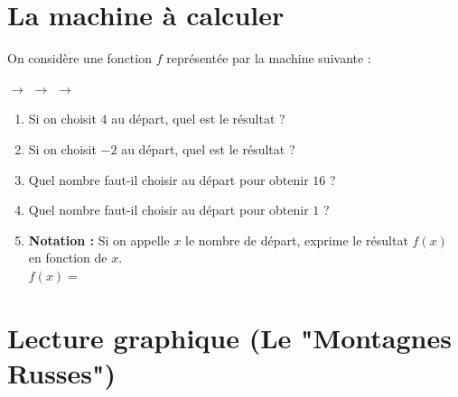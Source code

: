 \documentclass[a4paper]{book}
\begin{document}
    
\section{La machine à calculer}
    
    \begin{exercice}
        On considère une fonction $f$ représentée par la machine suivante :
        \begin{center}
             $\longrightarrow$  $\longrightarrow$  $\longrightarrow$ 
        \end{center}
        
        \begin{enumerate}
            \item Si on choisit $4$ au départ, quel est le résultat ? \dotfill
            \item Si on choisit $-2$ au départ, quel est le résultat ? \dotfill
            \item Quel nombre faut-il choisir au départ pour obtenir $16$ ? \dotfill
            \item Quel nombre faut-il choisir au départ pour obtenir $1$ ? \dotfill
            \item \textbf{Notation :} Si on appelle $x$ le nombre de départ, exprime le résultat $f(x)$ en fonction de $x$. \\ $f(x) = $ \dotfill
        \end{enumerate}
    \end{exercice}
    
\section{Lecture graphique (Le "Montagnes Russes")}
    
\end{document}
